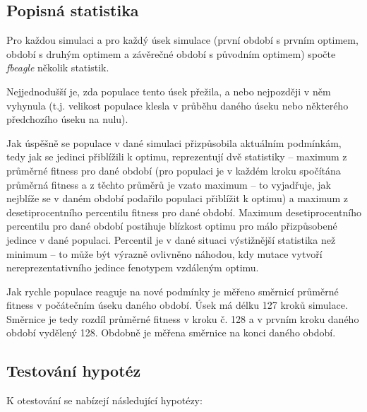 \subsection{Popisná statistika}

Pro každou simulaci a pro každý úsek simulace (první období s prvním optimem,
období s druhým optimem a závěrečné období s původním optimem) spočte \textit{fbeagle} několik statistik.

Nejjednodušší je, zda populace tento úsek přežila, a nebo nejpozději v něm vyhynula
(t.j. velikost populace klesla v průběhu daného úseku nebo některého předchozího úseku na nulu).

Jak úspěšně se populace v dané simulaci přizpůsobila aktuálním podmínkám, tedy jak se jedinci přiblížili k optimu,
reprezentují dvě statistiky -- maximum z průměrné fitness pro dané období (pro populaci je v každém kroku
spočítána průměrná fitness a z těchto průměrů je vzato maximum -- to vyjadřuje, jak nejblíže se v daném období podařilo
populaci přiblížit k optimu) a maximum z desetiprocentního percentilu fitness pro dané období.
Maximum desetiprocentního percentilu pro dané období postihuje blízkost optimu pro
málo přizpůsobené jedince v dané populaci. Percentil je v dané situaci výstižnější statistika než minimum -- to může
být výrazně ovlivněno náhodou, kdy mutace vytvoří nereprezentativního jedince fenotypem vzdáleným optimu.

Jak rychle populace reaguje na nové podmínky je měřeno směrnicí průměrné fitness v počátečním úseku daného období.
Úsek má délku 127 kroků simulace. Směrnice je tedy rozdíl průměrné fitness v kroku č. 128 a v prvním kroku daného
období vydělený 128. Obdobně je měřena směrnice na konci daného období.

\subsection{Testování hypotéz}

K otestování se nabízejí následující hypotézy:

